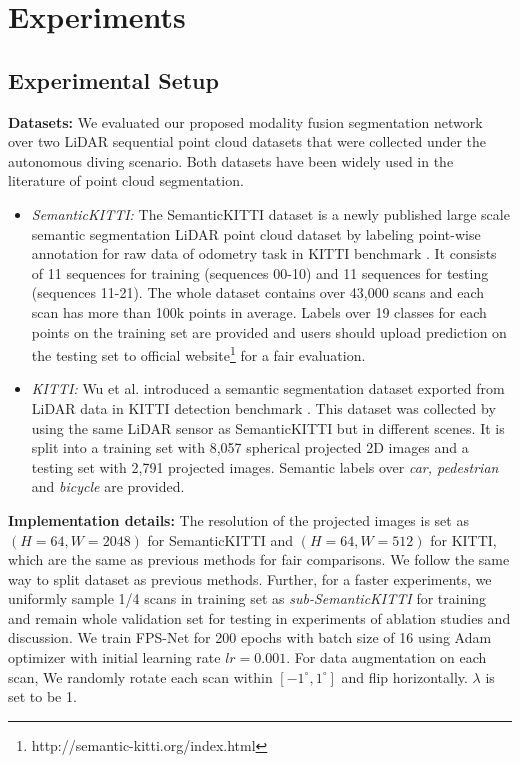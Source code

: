 \documentclass[preprint,review,3p]{elsarticle}
\begin{document}
\section{Experiments}\label{Sec.experiments}
\subsection{Experimental Setup}
\textbf{Datasets:}
We evaluated our proposed modality fusion segmentation network over two LiDAR sequential point cloud datasets that were collected under the autonomous diving scenario. Both datasets have been widely used in the literature of point cloud segmentation.
\begin{itemize}
    \item \textit{SemanticKITTI:} The SemanticKITTI dataset \cite{behley2019semantickitti} is a newly published large scale semantic segmentation LiDAR point cloud dataset by labeling point-wise annotation for raw data of odometry task in KITTI benchmark \cite{geiger2012kitti}. It consists of 11 sequences for training (sequences 00-10) and 11 sequences for testing (sequences 11-21). The whole dataset contains over 43,000 scans and each scan has more than 100k points in average. Labels over 19 classes for each points on the training set are provided and users should upload prediction on the testing set to official website\footnote{http://semantic-kitti.org/index.html} for a fair evaluation.
    \item \textit{KITTI:} Wu et al.\cite{wu2018squeezeseg} introduced a semantic segmentation dataset exported from LiDAR data in KITTI detection benchmark \cite{geiger2012kitti}. This dataset was collected by using the same LiDAR sensor as SemanticKITTI but in different scenes. It is split into a training set with 8,057 spherical projected 2D images and a testing set with 2,791 projected images. Semantic labels over \textit{car, pedestrian} and \textit{bicycle} are provided.
\end{itemize}

\textbf{Implementation details:} The resolution of the projected images is set as $(H=64,W=2048)$ for SemanticKITTI and $(H=64,W=512)$ for KITTI, which are the same as previous methods \cite{wu2018squeezeseg,wu2019squeezesegv2,milioto2019rangenet++, biasutti2019lunet} for fair comparisons.
We follow the same way to split dataset as previous methods. Further, for a faster experiments, we uniformly sample 1/4 scans in training set as \textit{sub-SemanticKITTI} for training and remain whole validation set for testing in experiments of ablation studies and discussion. We train FPS-Net for 200 epochs with batch size of 16 using Adam optimizer with initial learning rate $lr=0.001$. For data augmentation on each scan, We randomly rotate each scan within $[-1^\circ,1^\circ]$ and flip horizontally. $\lambda$ is set to be 1. 
\end{document}
